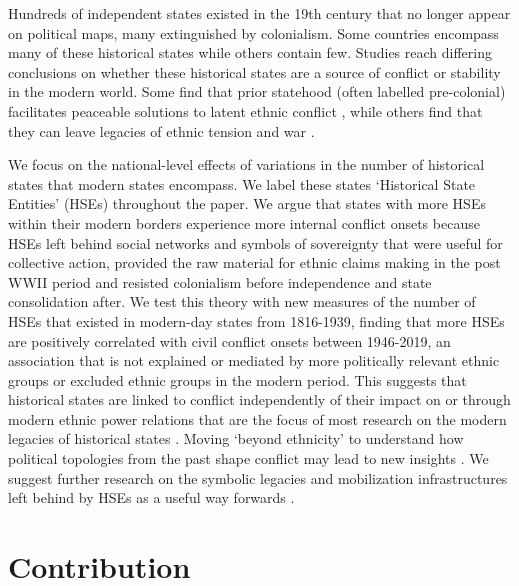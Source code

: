 Hundreds of independent states existed in the 19th century that no longer appear on political maps, many extinguished by colonialism. Some
countries encompass many of these historical states while others contain few.
Studies reach differing conclusions on whether these historical states are a
source of conflict or stability in the modern world. Some find that prior
statehood (often labelled pre-colonial) facilitates peaceable solutions to
latent ethnic conflict \citep{Depetris-Chauvin2016, Wig2016}, while others find
that they can leave legacies of ethnic tension and war \citep{Besley2014,
Paine2019, Englebert2000, Alesina2003}. 

We focus on the national-level effects of variations in the number of historical
states that modern states encompass. We label these states `Historical State
Entities' (HSEs) throughout the paper. We argue that states with more HSEs
within their modern borders experience more internal conflict onsets because
HSEs left behind social networks and symbols of sovereignty that were useful for
collective action, provided the raw material for ethnic claims making in the
post WWII period and resisted colonialism before independence and state
consolidation after. We test this theory with new measures of the number of HSEs
that existed in modern-day states from 1816-1939, finding that more HSEs
are positively correlated with civil conflict onsets between
1946-2019, an association that is not explained or mediated by more politically
relevant ethnic groups or excluded ethnic groups in the modern period. This
suggests that historical states are linked to conflict independently of their
impact on or through modern ethnic power relations that are the focus of most
research on the modern legacies of historical states \citep{Paine2019, Wig2016}.
Moving `beyond ethnicity' to understand how political topologies from the past
shape conflict may lead to new insights \citep{Herbst2014, Blaydes2013, Mazzuca2021}. We
suggest further research on the symbolic legacies and mobilization
infrastructures left behind by HSEs as a useful way forwards \citep{Ahram2019}. 

\section{Contribution}


